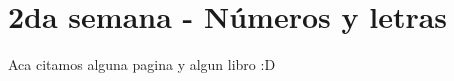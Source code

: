 \chapter{2da semana - Números y letras}

Aca citamos alguna pagina \cite{algo} y algun libro \cite{otro} :D
